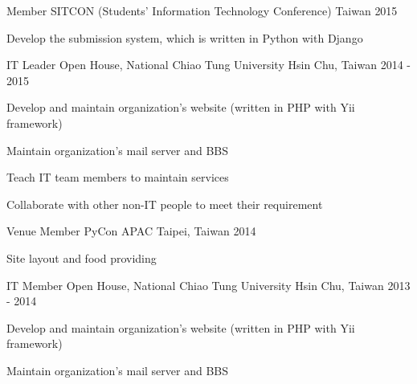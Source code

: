 

\begin{cventries}

  \cventry
    {Member} %
    {SITCON (Students' Information Technology Conference)} %
    {Taiwan} %
    {2015} %
    {
      \begin{cvitems} %
        \item {Develop the submission system, which is written in Python with Django}
      \end{cvitems}
    }

  \cventry
    {IT Leader} %
    {Open House, National Chiao Tung University} %
    {Hsin Chu, Taiwan} %
    {2014 - 2015} %
    {
      \begin{cvitems} %
        \item {Develop and maintain organization's website (written in PHP with Yii framework)}
        \item {Maintain organization's mail server and BBS}
        \item {Teach IT team members to maintain services}
        \item {Collaborate with other non-IT people to meet their requirement}
      \end{cvitems}
    }

  \cventry
    {Venue Member} %
    {PyCon APAC} %
    {Taipei, Taiwan} %
    {2014} %
    {
      \begin{cvitems} %
        \item {Site layout and food providing}
      \end{cvitems}
    }

  \cventry
    {IT Member} %
    {Open House, National Chiao Tung University} %
    {Hsin Chu, Taiwan} %
    {2013 - 2014} %
    {
      \begin{cvitems} %
        \item {Develop and maintain organization's website (written in PHP with Yii framework)}
        \item {Maintain organization's mail server and BBS}
      \end{cvitems}
    }

\end{cventries}

